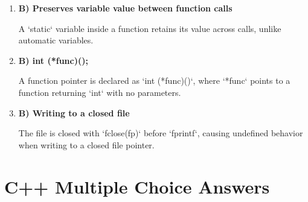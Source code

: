 \documentclass[a4paper,12pt]{article}
\begin{document}
\begin{enumerate}
    \item \textbf{B) Preserves variable value between function calls}

    A `static` variable inside a function retains its value across calls, unlike automatic variables.

    \item \textbf{B) int (*func)();}

    A function pointer is declared as `int (*func)()`, where `*func` points to a function returning `int` with no parameters.

    \item \textbf{B) Writing to a closed file}

    The file is closed with `fclose(fp)` before `fprintf`, causing undefined behavior when writing to a closed file pointer.
\end{enumerate}

\section{C++ Multiple Choice Answers}
\end{document}
